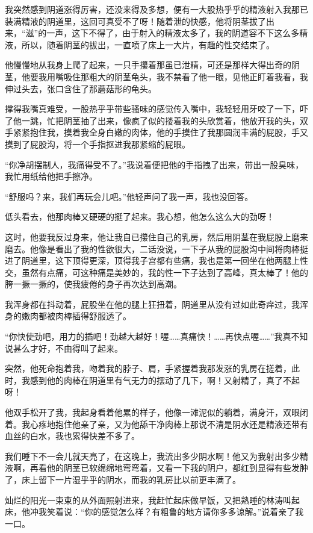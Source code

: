 \documentclass[12pt,UTF8]{ctexbook}
\begin{document}
我突然感到阴道涨得厉害，还没来得及多想，便有一大股热乎乎的精液射入我那已装满精液的阴道里，这回可真受不了呀！随着泄的快感，他将阴茎拔了出来，“滋”的一声，这下不得了，由于射入的精液太多了，我的阴道容不下这么多精液，所以，随着阴茎的拔出，一直喷了床上一大片，有趣的性交结束了。

他慢慢地从我身上爬了起来，一只手攥着那虽已泄精，可还是那样大得出奇的阴茎，他要我用嘴吸住那粗大的阴茎龟头，我不禁看了他一眼，见他正盯着我看，我伸过头去，张口含住了那蘑菇形的龟头。

撑得我嘴真难受，一股热乎乎带些骚味的感觉传入嘴中，我轻轻用牙咬了一下，吓了他一跳，忙把阴茎抽了出来，像疯了似的搂着我的头欣赏着，他放开我的头，双手紧紧抱住我，摸着我全身白嫩的肉体，他的手摸住了我那圆润丰满的屁股，手又摸到了屁股沟，将一个手指抠进我那紧缩的屁眼。

“你净胡摆制人，我痛得受不了。”我说着便把他的手指拽了出来，带出一股臭味，我忙用纸给他把手擦净。

“舒服吗？来，我们再玩会儿吧。”他轻声问了我一声，我也没回答。

低头看去，他那肉棒又硬硬的挺了起来。我心想，他怎么这么大的劲呀！

这时，他要我反过身来，他让我自已攥住自己的乳房，然后用阴茎在我屁股上磨来磨去。他像是看出了我的性欲很大，二话没说，一下子从我的屁股沟中间将肉棒挺进了阴道里，这下顶得更深，顶得我子宫都有些痛，我也是第一回坐在他两腿上性交，虽然有点痛，可这种痛是美妙的，我的性一下子达到了高峰，真太棒了！他的胯一撅一撅的，使我疲倦的身子再次达到高潮。

我浑身都在抖动着，屁股坐在他的腿上狂扭着，阴道里从没有过如此奇痒过，我浑身的嫩肉都被肉棒插得舒服透了。

“你快使劲吧，用力的插吧！劲越大越好！喔……真痛快！……再快点喔……”我真不知说甚么才好，不由得叫了起来。

突然，他死命抱着我，吻着我的脖子、肩，手紧握着我那发涨的乳房在搓着，此时，我感到他的肉棒在阴道里有气无力的摆动了几下，啊！又射精了，真了不起呀！

他双手松开了我，我起身看着他累的样子，他像一滩泥似的躺着，满身汗，双眼闭着。我心疼地抱住他亲了亲，又为他舔干净肉棒上那说不清是阴水还是精液还带有血丝的白水，我也累得快差不多了。

我们睡下不一会儿就天亮了，在这晚上，我流出多少阴水啊！他又为我射出多少精液啊，再看他的阴茎已软绵绵地弯弯着，又看一下我的阴户，都红到显得有些发肿了，床上留下一片湿乎乎的阴水，而我的乳房比以前更丰满了。

灿烂的阳光一束束的从外面照射进来，我赶忙起床做早饭，又把熟睡的林涛叫起床，他冲我笑着说：“你的感觉怎么样？有粗鲁的地方请你多多谅解。”说着亲了我一口。
\end{document}
